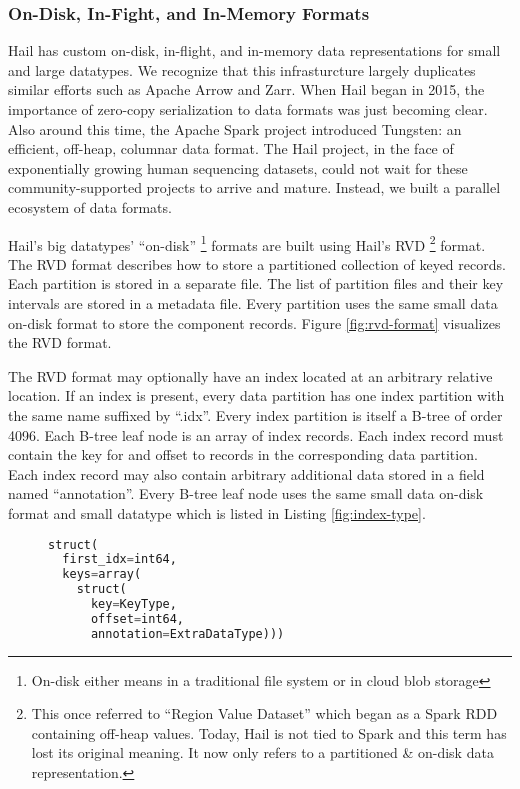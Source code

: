 \documentclass[10pt,a4paper%
]{article}
\begin{document}
\subsubsection{On-Disk, In-Fight, and In-Memory Formats}

Hail has custom on-disk, in-flight, and in-memory data representations for small and large datatypes.
We recognize that this infrasturcture largely duplicates similar efforts such as Apache Arrow and Zarr.
When Hail began in 2015, the importance of zero-copy serialization to data formats was just becoming clear.
Also around this time, the Apache Spark project introduced Tungsten: an efficient, off-heap, columnar data format.
The Hail project, in the face of exponentially growing human sequencing datasets, could not wait for these community-supported projects to arrive and mature.
Instead, we built a parallel ecosystem of data formats.

Hail's big datatypes' ``on-disk''%
\footnote{On-disk either means in a traditional file system or in cloud blob storage}
formats are built using Hail's RVD%
\footnote{
This once referred to ``Region Value Dataset'' which began as a Spark RDD containing off-heap values.
Today, Hail is not tied to Spark and this term has lost its original meaning.
It now only refers to a partitioned \& on-disk data representation.
}
format.
The RVD format describes how to store a partitioned collection of keyed records.
Each partition is stored in a separate file.
The list of partition files and their key intervals are stored in a metadata file.
Every partition uses the same small data on-disk format to store the component records.
Figure \ref{fig:rvd-format} visualizes the RVD format.

The RVD format may optionally have an index located at an arbitrary relative location.
If an index is present, every data partition has one index partition with the same name suffixed by ``.idx''.
Every index partition is itself a B-tree of order 4096.
Each B-tree leaf node is an array of index records.
Each index record must contain the key for and offset to records in the corresponding data partition.
Each index record may also contain arbitrary additional data stored in a field named ``annotation''.
Every B-tree leaf node uses the same small data on-disk format and small datatype which is listed in Listing \ref{fig:index-type}.

\begin{figure}[h]
\begin{lstlisting}[language=Python, caption=The type of an RVD index file., label=fig:index-type]
struct(
  first_idx=int64,
  keys=array(
    struct(
      key=KeyType,
      offset=int64,
      annotation=ExtraDataType)))
\end{lstlisting}
\end{figure}
\end{document}
